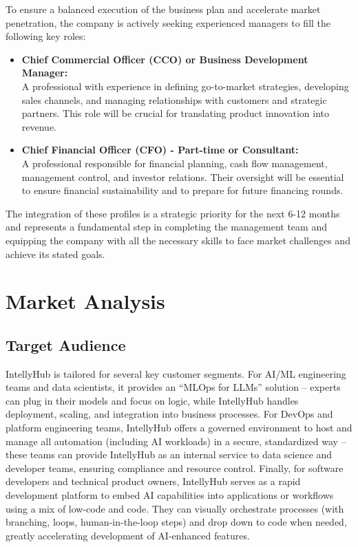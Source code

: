 \documentclass[11pt, a4paper, oneside]{article}
\begin{document}
To ensure a balanced execution of the business plan and accelerate market penetration, the company is actively seeking experienced managers to fill the following key roles:

\begin{itemize}
    \item \textbf{Chief Commercial Officer (CCO) or Business Development Manager:} \\
    A professional with experience in defining go-to-market strategies, developing sales channels, and managing relationships with customers and strategic partners. This role will be crucial for translating product innovation into revenue.

    \item \textbf{Chief Financial Officer (CFO) - Part-time or Consultant:} \\
    A professional responsible for financial planning, cash flow management, management control, and investor relations. Their oversight will be essential to ensure financial sustainability and to prepare for future financing rounds.
\end{itemize}

The integration of these profiles is a strategic priority for the next 6-12 months and represents a fundamental step in completing the management team and equipping the company with all the necessary skills to face market challenges and achieve its stated goals.


\section{Market Analysis}
\subsection{Target Audience}
IntellyHub is tailored for several key customer segments. For AI/ML engineering teams and data scientists, it provides an “MLOps for LLMs” solution – experts can plug in their models and focus on logic, while IntellyHub handles deployment, scaling, and integration into business processes. For DevOps and platform engineering teams, IntellyHub offers a governed environment to host and manage all automation (including AI workloads) in a secure, standardized way – these teams can provide IntellyHub as an internal service to data science and developer teams, ensuring compliance and resource control. Finally, for software developers and technical product owners, IntellyHub serves as a rapid development platform to embed AI capabilities into applications or workflows using a mix of low-code and code. They can visually orchestrate processes (with branching, loops, human-in-the-loop steps) and drop down to code when needed, greatly accelerating development of AI-enhanced features.
\end{document}
